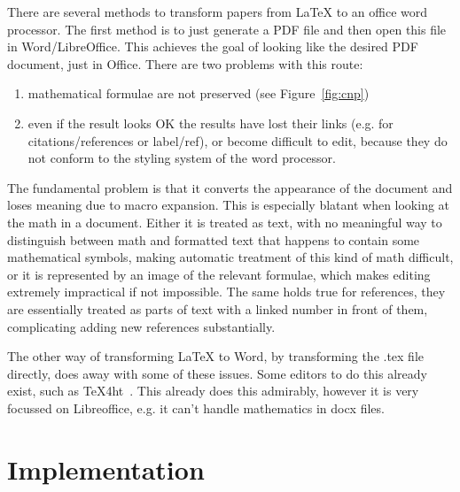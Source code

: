 \documentclass{llncs}
\begin{document}
There are several methods to transform papers from {\LaTeX} to an office word
processor. The first method is to just generate a PDF file and then open this file in
Word/LibreOffice. This achieves the goal of looking like the desired PDF document, just in
Office. There are two problems with this route: 
\begin{enumerate}
\item mathematical formulae are not preserved (see Figure~\ref{fig:cnp})
\item even if the result looks OK the results have lost their links (e.g. for
  citations/references or label/ref), or become difficult to edit, because they do not
  conform to the styling system of the word processor.
\end{enumerate}
The fundamental problem is that it converts the appearance of the document and loses
meaning due to macro expansion. This is especially blatant when looking at the math in a
document. Either it is treated as text, with no meaningful way to distinguish between math
and formatted text that happens to contain some mathematical symbols, making automatic
treatment of this kind of math difficult, or it is represented by an image of the relevant
formulae, which makes editing extremely impractical if not impossible. The same holds true
for references, they are essentially treated as parts of text with a linked number in
front of them, complicating adding new references substantially.

The other way of transforming {\LaTeX} to Word, by transforming the .tex file directly,
does away with some of these issues. Some editors to do this already exist, such as
TeX4ht~\cite{tex4ht:online}. This already does this admirably, however it is very focussed
on Libreoffice, e.g. it can't handle mathematics in docx files.

\section{Implementation}\label{sec:impl}
\end{document}
